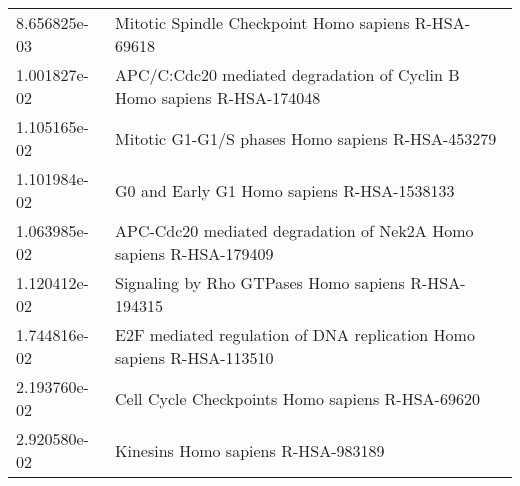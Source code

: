 \begin{longtable}{p{2.4cm}p{14.5cm}}
             8.656825e-03 &                                                                                                    Mitotic Spindle Checkpoint Homo sapiens R-HSA-69618 \\
             1.001827e-02 &                                                                                 APC/C:Cdc20 mediated degradation of Cyclin B Homo sapiens R-HSA-174048 \\
             1.105165e-02 &                                                                                                       Mitotic G1-G1/S phases Homo sapiens R-HSA-453279 \\
             1.101984e-02 &                                                                                                             G0 and Early G1 Homo sapiens R-HSA-1538133 \\
             1.063985e-02 &                                                                                      APC-Cdc20 mediated degradation of Nek2A Homo sapiens R-HSA-179409 \\
             1.120412e-02 &                                                                                                     Signaling by Rho GTPases Homo sapiens R-HSA-194315 \\
             1.744816e-02 &                                                                                   E2F mediated regulation of DNA replication Homo sapiens R-HSA-113510 \\
             2.193760e-02 &                                                                                                        Cell Cycle Checkpoints Homo sapiens R-HSA-69620 \\
             2.920580e-02 &                                                                                                                     Kinesins Homo sapiens R-HSA-983189 \\
\end{longtable}


